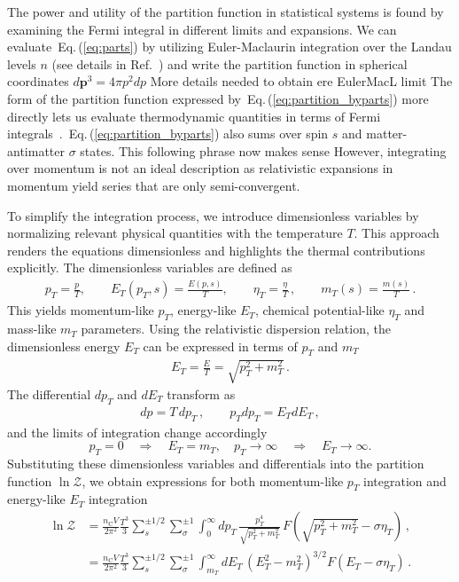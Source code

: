 \documentclass[epjST]{svjour}
\newcommand{\req}[1]{Eq.\,(\ref{#1})}
\begin{document}
The power and utility of the partition function in statistical systems is found by examining the Fermi integral in different limits and expansions. We can evaluate~\req{eq:parts} by utilizing Euler-Maclaurin integration over the Landau levels \(n\) (see details in Ref.~\cite{Steinmetz:2023nsc}) and write the partition function in spherical coordinates \(d\mathbf{p}^{3}=4\pi p^{2}dp\) 
{\color{red}More details needed to obtain ere EulerMacL limit} The form of the partition function expressed by~\req{eq:partition_byparts} more directly lets us evaluate thermodynamic quantities in terms of Fermi integrals~\cite{Elze:1980er,Birrell:2024bdb}.~\req{eq:partition_byparts} also sums over spin \(s\) and matter-antimatter \(\sigma\) states.
{\color{red}This following phrase now makes sense} 
However, integrating over momentum is not an ideal description as relativistic expansions in momentum yield series that are only semi-convergent. 
 
To simplify the integration process, we introduce dimensionless variables by normalizing relevant physical quantities with the temperature \( T \). This approach renders the equations dimensionless and highlights the thermal contributions explicitly. The dimensionless variables are defined as
\begin{align}
\label{eq:dimensionless_variables}
p_{T} = \frac{p}{T}, \qquad E_{T}(p_{T},s) = \frac{E(p,s)}{T}, \qquad \eta_{T} = \frac{\eta}{T}\,, \qquad m_{T}(s) = \frac{m(s)}{T}\,.
\end{align}
This yields momentum-like \(p_{T}\), energy-like \(E_{T}\), chemical potential-like \(\eta_{T}\) and mass-like \(m_{T}\) parameters. Using the relativistic dispersion relation, the dimensionless energy \( E_{T} \) can be expressed in terms of \( p_{T} \) and \( m_{T} \)
\begin{align}
E_{T} = \frac{E}{T} = \sqrt{p_{T}^{2} + m_{T}^{2}}\,.
\end{align}
The differential \( dp_{T} \) and \( dE_{T} \) transform as
\begin{align}
dp = T \, dp_{T}\,,\qquad p_{T}dp_{T} = E_{T} dE_{T}\,,
\end{align}
and the limits of integration change accordingly
\begin{equation}
p_{T} = 0 \quad \Rightarrow \quad E_{T} = m_{T}, \quad p_{T} \to \infty \quad \Rightarrow \quad E_{T} \to \infty.
\end{equation}
Substituting these dimensionless variables and differentials into the partition function \( \ln\mathcal{Z} \), we obtain expressions for both momentum-like \(p_{T}\) integration and energy-like \(E_{T}\) integration
\begin{align}
\label{eq:dimensionless_partition}
\ln\mathcal{Z} 
&= \frac{n_\mathrm{C} V}{2\pi^{2}} \frac{T^{3}}{3} \sum_{s}^{\pm1/2}\sum_{\sigma}^{\pm1} \int_{0}^{\infty} dp_{T} \, \frac{p_{T}^{4}}{\sqrt{p_{T}^{2} + m_{T}^{2}}} \, F\left(\sqrt{p_{T}^{2} + m_{T}^{2}} - \sigma\eta_{T}\right)\,,\\
\label{eq:dimensionless_partition2}
&= \frac{n_\mathrm{C} V}{2\pi^{2}} \frac{T^{3}}{3} \sum_{s}^{\pm1/2}\sum_{\sigma}^{\pm1} \int_{m_{T}}^{\infty} dE_{T} \, (E_{T}^2-m_{T}^2)^{3/2} F\left(E_{T} - \sigma\eta_{T}\right)\,.
\end{align}
\end{document}
